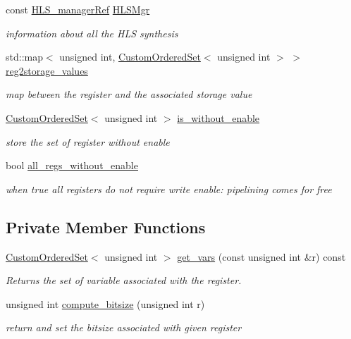 \begin{DoxyCompactItemize}
const \hyperlink{hls__manager_8hpp_acd3842b8589fe52c08fc0b2fcc813bfe}{H\+L\+S\+\_\+manager\+Ref} \hyperlink{classreg__binding_a44cf9d4cabb4dcb2e0c5654607ebec24}{H\+L\+S\+Mgr}
\begin{DoxyCompactList}\small\item\em information about all the H\+LS synthesis \end{DoxyCompactList}\item 
std\+::map$<$ unsigned int, \hyperlink{classCustomOrderedSet}{Custom\+Ordered\+Set}$<$ unsigned int $>$ $>$ \hyperlink{classreg__binding_a297e1876e3d97faee75b5db688dedfa1}{reg2storage\+\_\+values}
\begin{DoxyCompactList}\small\item\em map between the register and the associated storage value \end{DoxyCompactList}\item 
\hyperlink{classCustomOrderedSet}{Custom\+Ordered\+Set}$<$ unsigned int $>$ \hyperlink{classreg__binding_ad7f2d5e7ac076a71847765dd8c7e3b75}{is\+\_\+without\+\_\+enable}
\begin{DoxyCompactList}\small\item\em store the set of register without enable \end{DoxyCompactList}\item 
bool \hyperlink{classreg__binding_a1d7d423897ff0a25db54fb26ef9b76c9}{all\+\_\+regs\+\_\+without\+\_\+enable}
\begin{DoxyCompactList}\small\item\em when true all registers do not require write enable\+: pipelining comes for free \end{DoxyCompactList}\end{DoxyCompactItemize}
\subsection*{Private Member Functions}
\begin{DoxyCompactItemize}
\item 
\hyperlink{classCustomOrderedSet}{Custom\+Ordered\+Set}$<$ unsigned int $>$ \hyperlink{classreg__binding_a26f68e6f78394ba39512dc5a519a839e}{get\+\_\+vars} (const unsigned int \&r) const
\begin{DoxyCompactList}\small\item\em Returns the set of variable associated with the register. \end{DoxyCompactList}\item 
unsigned int \hyperlink{classreg__binding_a697ec0dfee640bc2ef57c102a7a8c7a3}{compute\+\_\+bitsize} (unsigned int r)
\begin{DoxyCompactList}\small\item\em return and set the bitsize associated with given register \end{DoxyCompactList}\end{DoxyCompactItemize}


